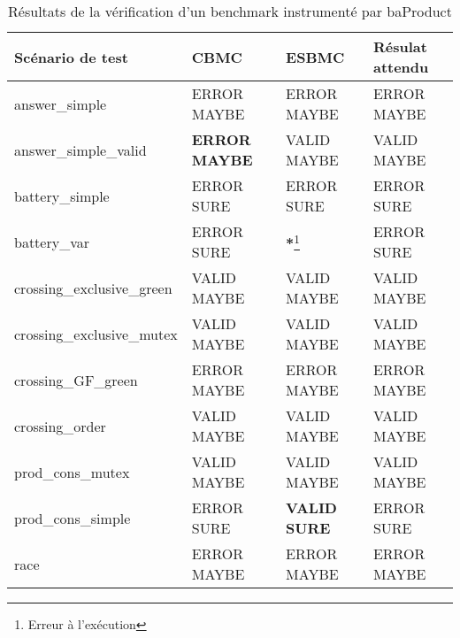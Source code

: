 \begin{table}[tbp]
\centering
\caption{Résultats de la vérification d'un benchmark instrumenté par baProduct}
\label{tbl:resultats}
\begin{tabular}{|l|l|l|l|}
\hline
Scénario de test           & CBMC                 & ESBMC            & Résulat attendu \\
\hline
answer\_simple             & ERROR MAYBE          & ERROR MAYBE      & ERROR MAYBE     \\
answer\_simple\_valid      & \textbf{ERROR MAYBE} & VALID MAYBE      & VALID MAYBE     \\
battery\_simple            & ERROR SURE           & ERROR SURE       & ERROR SURE      \\
battery\_var               & ERROR SURE           & \textbf{*}\footnote{Erreur à l'exécution}& ERROR SURE      \\
crossing\_exclusive\_green & VALID MAYBE          & VALID MAYBE      & VALID MAYBE     \\
crossing\_exclusive\_mutex & VALID MAYBE          & VALID MAYBE      & VALID MAYBE     \\
crossing\_GF\_green        & ERROR MAYBE          & ERROR MAYBE      & ERROR MAYBE     \\
crossing\_order            & VALID MAYBE          & VALID MAYBE      & VALID MAYBE     \\
prod\_cons\_mutex          & VALID MAYBE          & VALID MAYBE      & VALID MAYBE     \\
prod\_cons\_simple         & ERROR SURE           & \textbf{VALID SURE} & ERROR SURE      \\
race                       & ERROR MAYBE          & ERROR MAYBE      & ERROR MAYBE     \\
\hline
\end{tabular}
\end{table}

